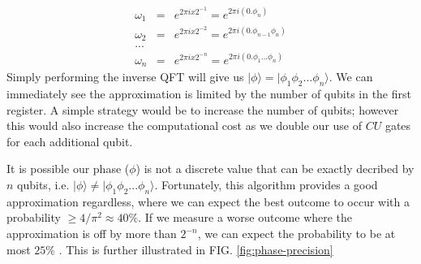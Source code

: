 \documentclass[msc,oneside]{ubcthesis}
\begin{document}
	\begin{eqnarray*}
		\omega_1 &=& e^{2\pi i x 2^{-1}} =  e^{2\pi i (0.\phi_n)}\\
		\omega_2 &=& e^{2\pi i x 2^{-2}} =  e^{2\pi i (0.\phi_{n-1}\phi_n)}\\
		...\\
		\omega_n &=& e^{2\pi i x 2^{-n}} =  e^{2\pi i (0.\phi_1...\phi_n)}
	\end{eqnarray*}
	Simply performing the inverse QFT will give us $|\phi\rangle =  |\phi_1\phi_2 ... \phi_n\rangle$.  We can immediately see the approximation is limited by the number of qubits in the first register. A simple strategy would be to increase the number of qubits; however this would also increase the computational cost as we double our use of $CU$ gates for each additional qubit.
	
	It is possible our phase ($\phi$) is not a discrete value that can be exactly decribed by $n$ qubits, i.e. $|\phi\rangle \neq  |\phi_1\phi_2 ... \phi_n\rangle$. Fortunately, this algorithm provides a good approximation regardless, where we can expect the best outcome to occur with a probability $\geq 4/{\pi^2}\approx 40\%$. If we measure a worse outcome where the approximation is off by more than $2^{-n}$, we can expect the probability to be at most $25\%$ \cite{Phase-estimation}. This is further illustrated in FIG. \ref{fig:phase-precision}
	
\end{document}
